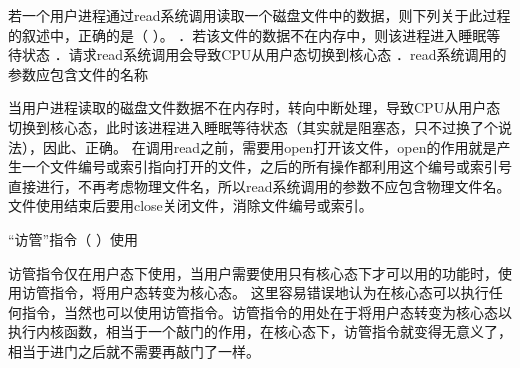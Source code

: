 \question 若一个用户进程通过read系统调用读取一个磁盘文件中的数据，则下列关于此过程的叙述中，正确的是（
）。 ．若该文件的数据不在内存中，则该进程进入睡眠等待状态
．请求read系统调用会导致CPU从用户态切换到核心态
．read系统调用的参数应包含文件的名称
\par{}
\begin{solution}当用户进程读取的磁盘文件数据不在内存时，转向中断处理，导致CPU从用户态切换到核心态，此时该进程进入睡眠等待状态（其实就是阻塞态，只不过换了个说法），因此、正确。
在调用read之前，需要用open打开该文件，open的作用就是产生一个文件编号或索引指向打开的文件，之后的所有操作都利用这个编号或索引号直接进行，不再考虑物理文件名，所以read系统调用的参数不应包含物理文件名。文件使用结束后要用close关闭文件，消除文件编号或索引。
\end{solution}
\question ``访管''指令（ ）使用
\par{}
\begin{solution}访管指令仅在用户态下使用，当用户需要使用只有核心态下才可以用的功能时，使用访管指令，将用户态转变为核心态。
这里容易错误地认为在核心态可以执行任何指令，当然也可以使用访管指令。访管指令的用处在于将用户态转变为核心态以执行内核函数，相当于一个敲门的作用，在核心态下，访管指令就变得无意义了，相当于进门之后就不需要再敲门了一样。
\end{solution}
